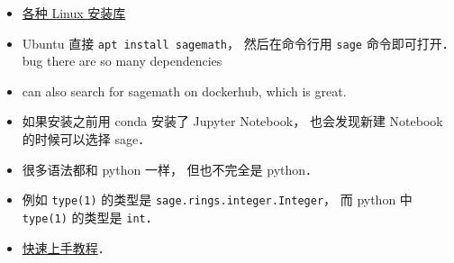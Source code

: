 
\begin{issues}
\issueDraft
\end{issues}

\begin{itemize}
\item \href{https://repology.org/project/sagemath/versions}{各种 Linux 安装库}
\item Ubuntu 直接 \verb|apt install sagemath|， 然后在命令行用 \verb|sage| 命令即可打开． bug there are so many dependencies
\item can also search for sagemath on dockerhub, which is great.
\item 如果安装之前用 conda 安装了 Jupyter Notebook， 也会发现新建 Notebook 的时候可以选择 sage．
\item 很多语法都和 python 一样， 但也不完全是 python．
\item 例如 \verb|type(1)| 的类型是 \verb|sage.rings.integer.Integer|， 而 python 中 \verb|type(1)| 的类型是 \verb|int|．
\item \href{https://www.sagemath.org/tour-quickstart.html}{快速上手教程}．
\end{itemize}

